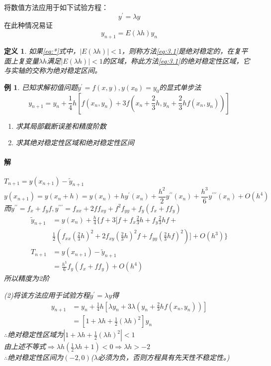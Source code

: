 \documentclass{article}
\newtheorem{definition}{定义}[section]
\newtheorem{example}{例}
\begin{document}
将数值方法应用于如下试验方程：
$$y^{'}=\lambda y $$
在此种情况易证
\begin{equation}
    y_{n+1}=E(\lambda h)y_n 
    \label{eq:*}
\end{equation}

\begin{definition}
    如果\ref{eq:*}式中，$|E(\lambda h)|<1$，则称方法\ref{eq:3.1}是绝对稳定的，在复平面上复变量$\lambda h$满足$|E(\lambda h)|<1$的区域，称此方法\ref{eq:3.1}的绝对稳定性区域，它与实轴的交称为绝对稳定区间。
\end{definition}

\begin{example}
    已知求解初值问题$y^{'}=f(x,y), y(x_0)=y_0$的显式单步法
    $$y_{n+1}=y_n+\frac{1}{4}h[f(x_n,y_n)+3f(x_n+\frac{2}{3}h,y_n+\frac{2}{3}hf(x_n,y_n))] $$
    \begin{enumerate}
        \item 求其局部截断误差和精度阶数
        \item 求其绝对稳定性区域和绝对稳定性区间
    \end{enumerate}

    \paragraph{解}$T_{n+1}=y(x_{n+1})-\widetilde{y}_{n+1} $
    $$y(x_{n+1})=y(x_n+h)=y(x_n)+hy^{'}(x_n)+\frac{h^2}{2}y^{{'}{'}}(x_n)+\frac{h^3}{6}y^{{'}{'}{'}}(x_n)+O(h^4) $$
    而$y^{{'}{'}}=f_x+f_yf, y^{{'}{'}{'}}=f_{xx}+2ff_{xy}+f^2f_{yy}+f_y(f_x+ff_y) $\\
    \begin{equation*}
        \begin{split}
            \widetilde{y}_{n+1}&=y(x_n) + \frac{h}{4}\{f+3[f+f_x\frac{2}{3}h+f_y\frac{2}{3}hf+\\
            &\frac{1}{2}(f_{xx}(\frac{2}{3}h)^2+2f_{xy}(\frac{2}{3}h)^2f+f_{yy}(\frac{2}{3}hf)^2)]+O(h^3) \} \\
            T_{n+1} &= y(x_{n+1})-\widetilde{y}_{n+1}\\
            &=\frac{h^3}{6}f_y(f_x+ff_y) + O(h^4) 
        \end{split}
    \end{equation*}
    所以精度为2阶

    (2)将该方法应用于试验方程$y^{'}=\lambda y$得
    \begin{equation*}
        \begin{split}
            y_{n+1}&=y_n+\frac{1}{4}h[\lambda y_n+3\lambda (y_n+\frac{2}{3}hf(x_n, y_n))] \\
            &=[1+\lambda h+\frac{1}{2}(\lambda h)^2]y_n
        \end{split}
    \end{equation*}
    $\therefore$绝对稳定性区域为$|1+\lambda h + \frac{1}{2}(\lambda h)^2|<1$\\
    由上述不等式$\Rightarrow \lambda h(\frac{1}{2}\lambda h+1)<0 \Rightarrow \lambda h>-2 $\\
    $\therefore $绝对稳定性区间为$(-2,0)$($\lambda$必须为负，否则方程具有先天性不稳定性。)
\end{example}
\end{document}
